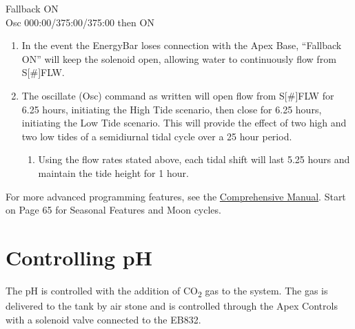 \documentclass[]{book}
\providecommand{\tightlist}{%
  \setlength{\itemsep}{0pt}\setlength{\parskip}{0pt}}
\begin{document}
Fallback ON\\
Osc 000:00/375:00/375:00 then ON

\begin{enumerate}
\def\labelenumi{\arabic{enumi}.}
\tightlist
\item
  In the event the EnergyBar loses connection with the Apex Base,
  ``Fallback ON'' will keep the solenoid open, allowing water to
  continuously flow from S{[}\#{]}FLW.\\
\item
  The oscillate (Osc) command as written will open flow from
  S{[}\#{]}FLW for 6.25 hours, initiating the High Tide scenario, then
  close for 6.25 hours, initiating the Low Tide scenario. This will
  provide the effect of two high and two low tides of a semidiurnal
  tidal cycle over a 25 hour period.

  \begin{enumerate}
  \def\labelenumii{\arabic{enumii}.}
  \tightlist
  \item
    Using the flow rates stated above, each tidal shift will last 5.25
    hours and maintain the tide height for 1 hour.
  \end{enumerate}
\end{enumerate}

For more advanced programming features, see the
\href{https://github.com/SilbigerLab/Mesocosm_User_Manual/tree/7503b88686aef920c4a4ed473b1efe37b34dae10/Manuals/Apex_Comprehensive_Reference_Manual.pdf}{Comprehensive
Manual}. Start on Page 65 for Seasonal Features and Moon cycles.

\chapter{Controlling pH}\label{controlling-ph}

The pH is controlled with the addition of CO\textsubscript{2} gas to the
system. The gas is delivered to the tank by air stone and is controlled
through the Apex Controls with a solenoid valve connected to the EB832.
\end{document}
